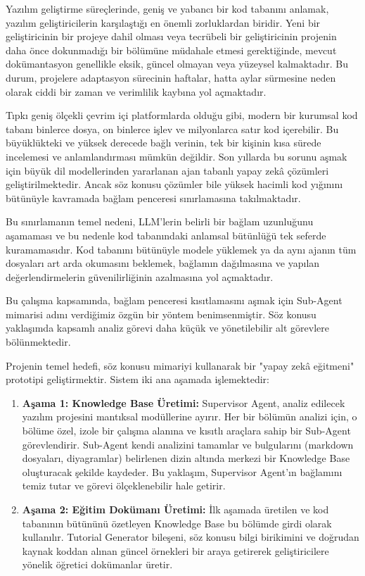 Yazılım geliştirme süreçlerinde, geniş ve yabancı bir kod tabanını anlamak, yazılım geliştiricilerin karşılaştığı en önemli zorluklardan biridir. Yeni bir geliştiricinin bir projeye dahil olması  veya tecrübeli bir geliştiricinin projenin daha önce dokunmadığı bir bölümüne müdahale etmesi gerektiğinde, mevcut dokümantasyon genellikle eksik, güncel olmayan veya yüzeysel kalmaktadır. Bu durum, projelere adaptasyon sürecinin haftalar, hatta aylar sürmesine neden olarak ciddi bir zaman ve verimlilik kaybına yol açmaktadır.

Tıpkı geniş ölçekli çevrim içi platformlarda olduğu gibi, modern bir kurumsal kod tabanı binlerce dosya, on binlerce işlev ve milyonlarca satır kod içerebilir. Bu büyüklükteki ve yüksek derecede bağlı verinin, tek bir kişinin kısa sürede incelemesi ve anlamlandırması mümkün değildir. Son yıllarda bu sorunu aşmak için büyük dil modellerinden yararlanan ajan tabanlı yapay zekâ çözümleri geliştirilmektedir. Ancak söz konusu çözümler bile yüksek hacimli kod yığınını bütünüyle kavramada bağlam penceresi sınırlamasına takılmaktadır.

Bu sınırlamanın temel nedeni, LLM'lerin belirli bir bağlam uzunluğunu aşamaması ve bu nedenle kod tabanındaki anlamsal bütünlüğü tek seferde kuramamasıdır. Kod tabanını bütünüyle modele yüklemek ya da aynı ajanın tüm dosyaları art arda okumasını beklemek, bağlamın dağılmasına ve yapılan değerlendirmelerin güvenilirliğinin azalmasına yol açmaktadır.

Bu çalışma kapsamında, bağlam penceresi kısıtlamasını aşmak için Sub-Agent mimarisi adını verdiğimiz özgün bir yöntem benimsenmiştir. Söz konusu yaklaşımda kapsamlı analiz görevi daha küçük ve yönetilebilir alt görevlere bölünmektedir.

Projenin temel hedefi, söz konusu mimariyi kullanarak bir "yapay zekâ eğitmeni" prototipi geliştirmektir. Sistem iki ana aşamada işlemektedir:
\begin{enumerate}
    \item \textbf{Aşama 1: Knowledge Base Üretimi:} Supervisor Agent, analiz edilecek yazılım projesini mantıksal modüllerine ayırır. Her bir bölümün analizi için, o bölüme özel, izole bir çalışma alanına ve kısıtlı araçlara sahip bir Sub-Agent görevlendirir. Sub-Agent kendi analizini tamamlar ve bulgularını (markdown dosyaları, diyagramlar) belirlenen dizin altında merkezi bir Knowledge Base oluşturacak şekilde kaydeder. Bu yaklaşım, Supervisor Agent'ın bağlamını temiz tutar ve görevi ölçeklenebilir hale getirir.
    \item \textbf{Aşama 2: Eğitim Dokümanı Üretimi:} İlk aşamada üretilen ve kod tabanının bütününü özetleyen Knowledge Base bu bölümde girdi olarak kullanılır. Tutorial Generator bileşeni, söz konusu bilgi birikimini ve doğrudan kaynak koddan alınan güncel örnekleri bir araya getirerek geliştiricilere yönelik öğretici dokümanlar üretir.
\end{enumerate}

